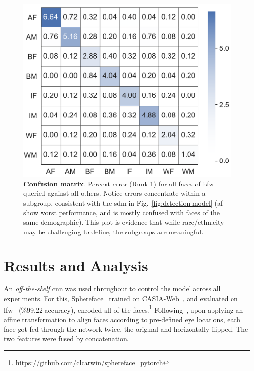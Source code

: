 \begin{figure}[t!]
	\centering    
	\includegraphics[width=\linewidth]{images/confusion.pdf}
		\caption{\small{\textbf{Confusion matrix.} Percent error (Rank 1) for all faces of \gls{bfw} queried against all others. Notice errors concentrate within a subgroup, consistent with the \gls{sdm} in Fig.~\ref{fig:detection-model} (\ie \gls{af} show worst performance, and is mostly confused with faces of the same demographic). This plot is evidence that while race/ethnicity may be challenging to define, the subgroups are meaningful.}}
		\label{fig:confusion} 
		\vspace{-5mm}
\end{figure} 

\section{Results and Analysis}
An {\em off-the-shelf} \gls{cnn} was used throughout to control the model across all experiments. For this, Sphereface~\cite{liu2017sphereface} trained on CASIA-Web~\cite{yi2014learning}, and evaluated on \gls{lfw}~\cite{LFWTech} (\%99.22 accuracy), encoded all of the faces.\footnote{\href{https://github.com/clcarwin/sphereface_pytorch}{https://github.com/clcarwin/sphereface_pytorch}} Following~\cite{liu2017sphereface}, upon applying an affine transformation to align faces according to pre-defined eye locations, each face got fed through the network twice, the original and horizontally flipped. The two features were fused by concatenation.


